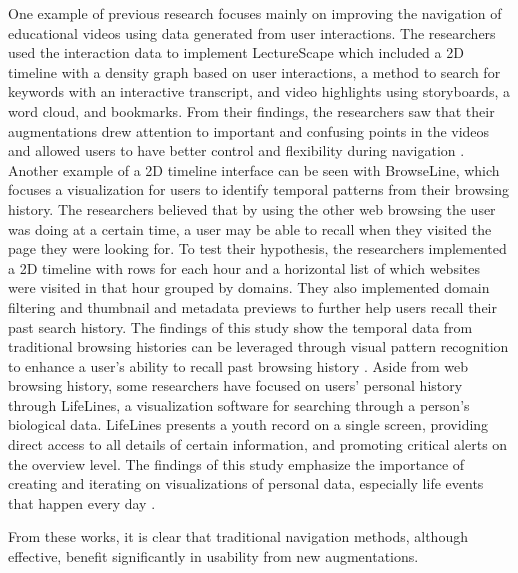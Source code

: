 \documentclass[doublespace,draft,nopageskip]{VTthesis} %
\begin{document}
One example of previous research focuses mainly on improving the navigation of educational videos using data generated from user interactions. The researchers used the interaction data to implement LectureScape which included a 2D timeline with a density graph based on user interactions, a method to search for keywords with an interactive transcript, and video highlights using storyboards, a word cloud, and bookmarks.  From their findings, the researchers saw that their augmentations drew attention to important and confusing points in the videos and allowed users to have better control and flexibility during navigation \cite{kimDatadrivenInteractionTechniques2014}.
Another example of a 2D timeline interface can be seen with BrowseLine, which focuses a visualization for users to identify temporal patterns from their browsing history. The researchers believed that by using the other web browsing the user was doing at a certain time, a user may be able to recall when they visited the page they were looking for. To test their hypothesis, the researchers implemented a 2D timeline with rows for each hour and a horizontal list of which websites were visited in that hour grouped by domains. They also implemented domain filtering and thumbnail and metadata previews to further help users recall their past search history. The findings of this study show the temporal data from traditional browsing histories can be leveraged through visual pattern recognition to enhance a user's ability to recall past browsing history \cite{hoeberBrowseLine2DTimeline2009}.
Aside from web browsing history, some researchers have focused on users' personal history through LifeLines, a visualization software for searching through a person's biological data. LifeLines presents a youth record on a single screen, providing direct access to all details of certain information, and promoting critical alerts on the overview level. The findings of this study emphasize the importance of creating and iterating on visualizations of personal data, especially life events that happen every day \cite{milashLifeLinesVisualizingPersonal1996}. 

From these works, it is clear that traditional navigation methods, although effective, benefit significantly in usability from new augmentations.
\end{document}
